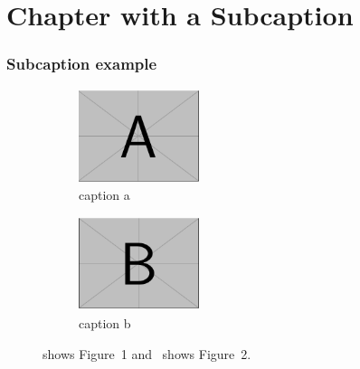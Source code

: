 \documentclass[document.tex]{subfiles}
\begin{document}
\chapter{Chapter with a Subcaption}
\subsection{Subcaption example}
\begin{figure}[ht]
    \centering
    \begin{subfigure}[b]{0.5\linewidth}
      \centering\includegraphics[width=100pt]{images/examples/image-a.png}
      \caption{\label{fig:fig1} caption a}
    \end{subfigure}%
    \begin{subfigure}[b]{0.5\linewidth}
      \centering\includegraphics[width=100pt]{images/examples/image-b.png}
      \caption{\label{fig:fig2} caption b}
    \end{subfigure}
    \caption{ shows Figure~1 and~ shows Figure~2.}
\end{figure}

\bib{}
\end{document}
